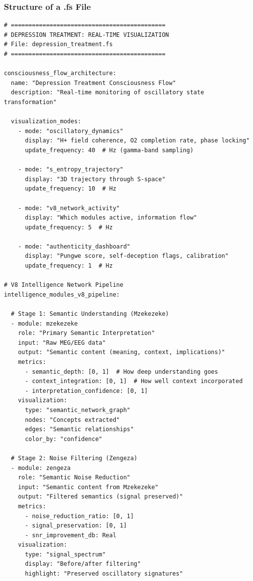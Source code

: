 \subsubsection{Structure of a .fs File}

\begin{verbatim}
# ============================================
# DEPRESSION TREATMENT: REAL-TIME VISUALIZATION
# File: depression_treatment.fs
# ============================================

consciousness_flow_architecture:
  name: "Depression Treatment Consciousness Flow"
  description: "Real-time monitoring of oscillatory state transformation"
  
  visualization_modes:
    - mode: "oscillatory_dynamics"
      display: "H+ field coherence, O2 completion rate, phase locking"
      update_frequency: 40  # Hz (gamma-band sampling)
      
    - mode: "s_entropy_trajectory"
      display: "3D trajectory through S-space"
      update_frequency: 10  # Hz
      
    - mode: "v8_network_activity"
      display: "Which modules active, information flow"
      update_frequency: 5  # Hz
      
    - mode: "authenticity_dashboard"
      display: "Pungwe score, self-deception flags, calibration"
      update_frequency: 1  # Hz

# V8 Intelligence Network Pipeline
intelligence_modules_v8_pipeline:
  
  # Stage 1: Semantic Understanding (Mzekezeke)
  - module: mzekezeke
    role: "Primary Semantic Interpretation"
    input: "Raw MEG/EEG data"
    output: "Semantic content (meaning, context, implications)"
    metrics:
      - semantic_depth: [0, 1]  # How deep understanding goes
      - context_integration: [0, 1]  # How well context incorporated
      - interpretation_confidence: [0, 1]
    visualization:
      type: "semantic_network_graph"
      nodes: "Concepts extracted"
      edges: "Semantic relationships"
      color_by: "confidence"
  
  # Stage 2: Noise Filtering (Zengeza)
  - module: zengeza
    role: "Semantic Noise Reduction"
    input: "Semantic content from Mzekezeke"
    output: "Filtered semantics (signal preserved)"
    metrics:
      - noise_reduction_ratio: [0, 1]
      - signal_preservation: [0, 1]
      - snr_improvement_db: Real
    visualization:
      type: "signal_spectrum"
      display: "Before/after filtering"
      highlight: "Preserved oscillatory signatures"
  

\end{verbatim}
